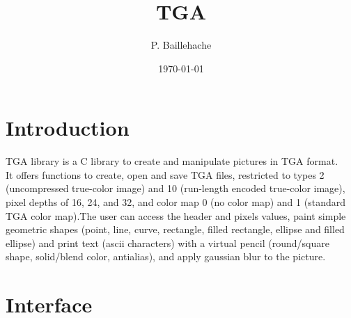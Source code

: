 \documentclass[12pt, a4paper]{article}
\begin{document}
\title{TGA}
\author{P. Baillehache}
\date{\today}
\maketitle

\tableofcontents

\section*{Introduction}

TGA library is a C library to create and manipulate pictures in TGA format.\\

It offers functions to create, open and save TGA files, restricted to types 2 (uncompressed true-color image) and 10 (run-length encoded true-color image), pixel depths of 16, 24, and 32, and color map 0 (no color map) and 1 (standard TGA color map).The user can access the header and pixels values, paint simple geometric shapes (point, line, curve, rectangle, filled rectangle, ellipse and filled ellipse) and print text (ascii characters) with a virtual pencil (round/square shape, solid/blend color, antialias), and apply gaussian blur to the picture.\\ 

\section{Interface}
\end{document}
